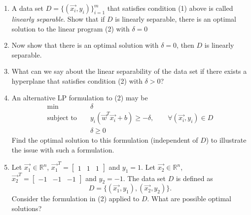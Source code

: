 \documentclass[11pt]{article}
\begin{document}
\ifnotsolution{\newpage}

\begin{enumerate}
\item {} A data set $D=\{(\vec{x_i},y_i)\}_{i=1}^m$ that satisfies 
      condition (1) above is called
      {\em linearly separable}. 
      Show that if $D$ is linearly separable, there is an optimal solution to the linear program (2) with $\delta=0$

\solution{ }      
      
\item {} Now show that there is an optimal solution with $\delta=0$, then $D$ is linearly separable.

\solution{ }

\item {} 
What can we say about the linear separability of the data set if there exists a hyperplane that satisfies condition (2) with $\delta>0$?

\solution{}

\item {}
An alternative LP formulation to (2) may be \newline
\begin{eqnarray}
  \min & & \delta  \nonumber \\
 \textrm{subject to } & & y_i(\vec{w}^T \vec{x_i} + b) \geq -\delta, \qquad \forall (\vec{x_i},y_i) \in D \nonumber  \\
  & & \delta \geq 0 \nonumber
\end{eqnarray}
Find the optimal solution to this formulation (independent of $D$) to illustrate the issue with such a
formulation.

\solution{}


\item {} Let $\vec{x_1} \in \mathbb{R}^n$, $\vec{x_1}^T =
\begin{bmatrix}
  1 & 1 & 1
\end{bmatrix}$ and $y_1 = 1$. 
Let
$\vec{x_2} \in \mathbb{R}^n$, $\vec{x_2}^T =
\begin{bmatrix}
  -1 & -1 & -1
\end{bmatrix}$ and $y_2 = -1$.
The data set $D$ is defined as
\begin{equation*}
    D = \{ (\vec{x_1},y_1), (\vec{x_2},y_2)\}.
\end{equation*}
Consider the formulation in (2)
applied to $D$. What are possible optimal solutions?
\end{enumerate}
\solution{}
\end{document}
